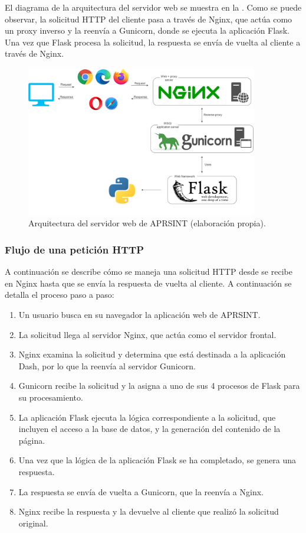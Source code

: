 El diagrama de la arquitectura del servidor web se muestra en la . Como se puede observar, la solicitud HTTP del cliente pasa a través de Nginx, que actúa como un proxy inverso y la reenvía a Gunicorn, donde se ejecuta la aplicación Flask. Una vez que Flask procesa la solicitud, la respuesta se envía de vuelta al cliente a través de Nginx.

\begin{figure}[h]
	\centering
	\includegraphics[width=0.9\textwidth]{Imagenes/Chapter_4/web_server.png}
	\caption[Arquitectura del servidor web de APRSINT.]{Arquitectura del servidor web de APRSINT (elaboración propia).}
	\label{fig:web-server}
\end{figure}

\subsubsection*{Flujo de una petición HTTP}

A continuación se describe cómo se maneja una solicitud HTTP desde se recibe en Nginx hasta que se envía la respuesta de vuelta al cliente. A continuación se detalla el proceso paso a paso:

\begin{enumerate}
	\item Un usuario busca en su navegador la aplicación web de APRSINT.
	\item La solicitud llega al servidor Nginx, que actúa como el servidor frontal.
	\item Nginx examina la solicitud y determina que está destinada a la aplicación Dash, por lo que la reenvía al servidor Gunicorn.
	\item Gunicorn recibe la solicitud y la asigna a uno de sus 4 procesos de Flask para su procesamiento.
	\item La aplicación Flask ejecuta la lógica correspondiente a la solicitud, que incluyen el acceso a la base de datos, y la generación del contenido de la página.
	\item Una vez que la lógica de la aplicación Flask se ha completado, se genera una respuesta.
	\item La respuesta se envía de vuelta a Gunicorn, que la reenvía a Nginx.
	\item Nginx recibe la respuesta y la devuelve al cliente que realizó la solicitud original.
\end{enumerate}

